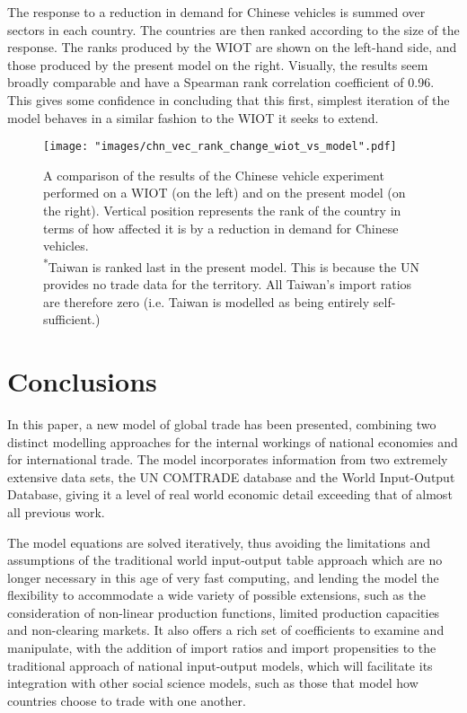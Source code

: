 \documentclass[a4paper]{article}
\begin{document}
The response to a reduction in demand for Chinese vehicles is summed over sectors in each country.
The countries are then ranked according to the size of the response.
The ranks produced by the WIOT are shown on the left-hand side, and those produced by the present model on the right.
Visually, the results seem broadly comparable and have a Spearman rank correlation coefficient \parencite{spearman_proof_1904} of 0.96.
This gives some confidence in concluding that this first, simplest iteration of the model behaves in a similar fashion to the WIOT it seeks to extend.

\begin{figure}[p]
\centering
\texttt{[image: "images/chn\_vec\_rank\_change\_wiot\_vs\_model".pdf]}
\caption{A comparison of the results of the Chinese vehicle experiment performed on a WIOT (on the left) and on the present model (on the right).
Vertical position represents the rank of the country in terms of how affected it is by a reduction in demand for Chinese vehicles.\\
\textsuperscript{*}Taiwan is ranked last in the present model.
This is because the UN provides no trade data for the territory.
All Taiwan's import ratios are therefore zero (i.e. Taiwan is modelled as being entirely self-sufficient.)}
\label{fig:chn_vec_model_vs_wiot}
\end{figure}


\section{Conclusions}\label{sec:conclusions}
In this paper, a new model of global trade has been presented, combining two distinct modelling approaches for the internal workings of national economies and for international trade.
The model incorporates information from two extremely extensive data sets, the UN COMTRADE database and the World Input-Output Database, giving it a level of real world economic detail exceeding that of almost all previous work.

The model equations are solved iteratively, thus avoiding the limitations and assumptions of the traditional world input-output table approach which are no longer necessary in this age of very fast computing, and lending the model the flexibility to accommodate a wide variety of possible extensions, such as the consideration of non-linear production functions, limited production capacities and non-clearing markets.
It also offers a rich set of coefficients to examine and manipulate, with the addition of import ratios and import propensities to the traditional approach of national input-output models, which will facilitate its integration with other social science models, such as those that model how countries choose to trade with one another.
\end{document}
